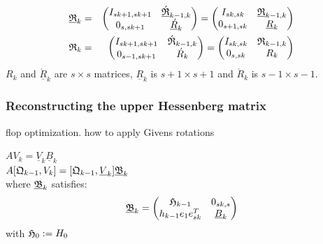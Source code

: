 \documentclass{scrartcl}
\begin{document}
\begin{eqnarray*}
\underline{\frak{R}}_k &=&
\begin{pmatrix}
	I_{sk + 1, sk + 1} & \underline{\acute{\frak{R}}}_{k - 1, k} \\
	0_{s, sk + 1} & \underline{\acute{R}}_k \\
\end{pmatrix} = 
\begin{pmatrix}
	I_{sk, sk} & \underline{\frak{R}}_{k - 1, k} \\
	0_{s + 1, sk} & \underline{R}_k \\
\end{pmatrix} \\
\frak{R}_k &=&
\begin{pmatrix}
	I_{sk + 1, sk + 1} & \acute{\frak{R}}_{k - 1, k} \\
	0_{s - 1, sk + 1} & \acute{R}_k \\
\end{pmatrix} = 
\begin{pmatrix}
	I_{sk, sk} & \frak{R}_{k - 1, k} \\
	0_{s, sk} & R_k \\
\end{pmatrix}
\end{eqnarray*}
$R_k$ and $\underline{\acute{R}}_k$ are $s \times s$ matrices, $\underline{R}_k$ is $s + 1 \times s + 1$ and $\acute{R}_k$ is $s - 1 \times s - 1$.
\subsubsection{Reconstructing the upper Hessenberg matrix}
flop optimization. how to apply Givens rotations

$AV_k = \underline{V}_k\underline{B}_k$ \\

$A [\frak{Q}_{k - 1}, V_k] = [\frak{Q}_{k - 1}, \underline{V}_k]\underline{\frak{B}}_k$ \\

where $\underline{\frak{B}}_k$ satisfies:
\begin{equation} \label{eq:B_blackletter_k_}
\underline{\frak{B}}_k = 
\begin{pmatrix}
	\frak{H}_{k - 1} & 0_{sk, s} \\
	h_{k - 1} e_1 e^T_{sk} & \underline{B}_k \\
\end{pmatrix}
\end{equation}
with $\frak{H}_0 := H_0$ \\
\end{document}
